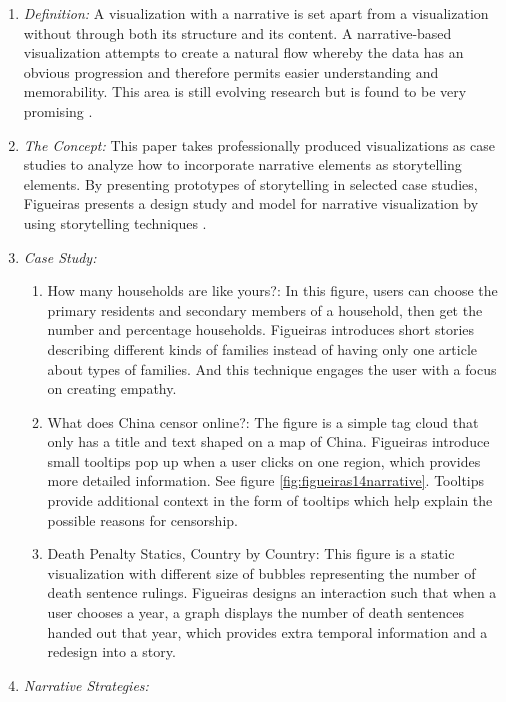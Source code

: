 \documentclass{egpubl}
\begin{document}
\begin{enumerate}
\item \textit{Definition:} A visualization with a narrative is set apart from a visualization without through both its structure and its content. A narrative-based visualization attempts to create a natural flow whereby the data has an obvious progression and therefore permits easier understanding and memorability. This area is still evolving research but is found to be very promising \cite{figueiras}.

\item \textit{The Concept:} This paper takes professionally produced visualizations as case studies to analyze how to incorporate narrative elements as storytelling elements. By presenting prototypes of storytelling in selected case studies, Figueiras presents a design study and model for narrative visualization by using storytelling techniques \cite{figueiras}.
\item \textit{Case Study:}
\begin{enumerate}
\item How many households are like yours?: In this figure, users can choose the primary residents and secondary members of a household, then get the number and percentage households. Figueiras \cite{figueiras} introduces short stories describing different kinds of families instead of having only one article about types of families. And this technique engages the user with a focus on creating empathy.
\item What does China censor online?: The figure is a simple tag cloud that only has a title and text shaped on a map of China. Figueiras \cite{figueiras} introduce small tooltips pop up when a user clicks on one region, which provides more detailed information. See figure \ref{fig:figueiras14narrative}. Tooltips provide additional context in the form of tooltips which help explain the possible reasons for censorship. 
\item Death Penalty Statics, Country by Country: This figure is a static visualization with different size of bubbles representing the number of death sentence rulings. Figueiras \cite{figueiras} designs an interaction such that when a user chooses a year, a graph displays the number of death sentences handed out that year, which provides extra temporal information and a redesign into a story. 
\end{enumerate}
\item  \textit{Narrative Strategies:} 
\begin{enumerate}
		

\end{enumerate}
\end{enumerate}
\end{document}

